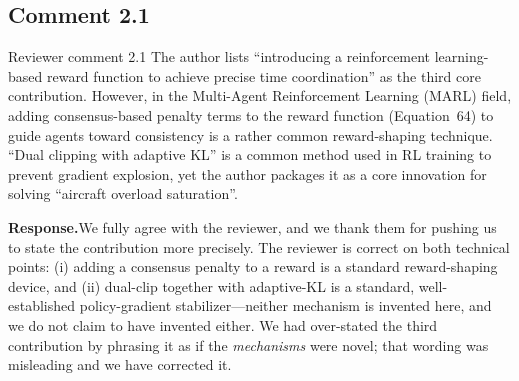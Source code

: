 \documentclass[11pt]{article}
\newcommand{\rsp}{\medskip\noindent\textbf{Response.}\quad}
\begin{document}
\subsection*{Comment 2.1}

\begin{reviewercomment}{Reviewer comment 2.1}
The author lists ``introducing a reinforcement learning-based reward function to
achieve precise time coordination'' as the third core contribution. However, in the
Multi-Agent Reinforcement Learning (MARL) field, adding consensus-based penalty terms
to the reward function (Equation~64) to guide agents toward consistency is a rather
common reward-shaping technique. ``Dual clipping with adaptive KL'' is a common method
used in RL training to prevent gradient explosion, yet the author packages it as a core
innovation for solving ``aircraft overload saturation''.
\end{reviewercomment}

\rsp We fully agree with the reviewer, and we thank them for pushing us to state the
contribution more precisely. The reviewer is correct on both technical points:
(i) adding a consensus penalty to a reward is a standard reward-shaping device, and
(ii) dual-clip together with adaptive-KL is a standard, well-established policy-gradient
stabilizer---neither mechanism is invented here, and we do not claim to have invented
either. We had over-stated the third contribution by phrasing it as if the
\emph{mechanisms} were novel; that wording was misleading and we have corrected it.
\end{document}
